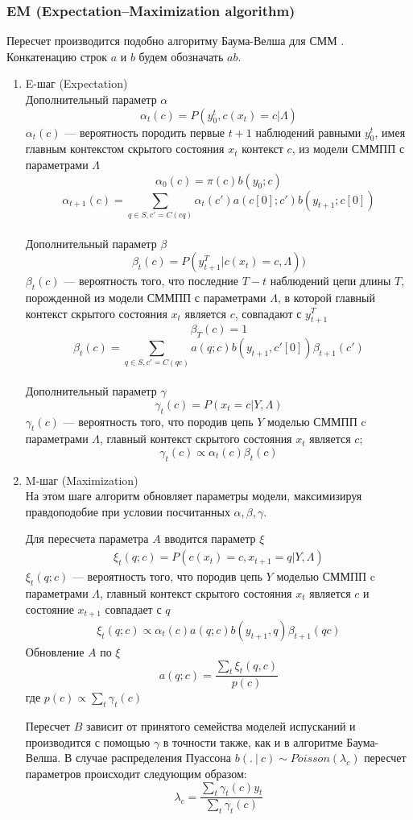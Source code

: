 \documentclass{matmex-diploma-custom}
\begin{document}
\subsubsection{EM (Expectation–Maximization algorithm)}
Пересчет производится подобно алгоритму Баума-Велша для СММ \cite{Rabiner1989}.
\\Конкатенацию строк $a$ и $b$ будем обозначать $ab$.
\\
\begin{enumerate}
\item E-шаг (Expectation)
\\Дополнительный параметр $\alpha$
$$ \alpha_{t}(c) = P(y_{0}^{t}, c(x_{t})=c| \Lambda)$$
$\alpha_{t}(c)$ --- вероятность породить первые $t+1$ наблюдений равными $y_{0}^{t}$, имея главным контекстом  скрытого состояния $x_{t}$ контекст $ c $, из модели СММПП с параметрами $\Lambda$
$$ \alpha_{0}(c) = \pi(c)b(y_{0}; c)$$ 
$$ \alpha_{t+1}(c) = \sum_{q \in S, c'=C(cq)}{\alpha_{t}(c')a(c[0];c')b(y_{t+1}; c[0])}$$
\\Дополнительный параметр $\beta$
$$ \beta_{t}(c) = P(y_{t+1}^{T}| c(x_{t})=c, \Lambda))$$
$\beta_{t}(c)$ --- вероятность того, что последние $T-t$ наблюдений цепи длины $T$, порожденной из модели СММПП с параметрами $\Lambda$, в которой главный контекст скрытого состояния $x_{t}$ является $ c $, совпадают с $y_{t+1}^{T}$
$$ \beta_{T}(c) = 1$$ 
$$ \beta_{t}(c) = \sum_{q \in S, c'=C(qc)}{a(q;c)b(y_{t+1}, c'[0])\beta_{t+1}(c')}$$
\\Дополнительный параметр $\gamma$
$$ \gamma_{t}(c) = P(x_{t}=c|Y,\Lambda) $$ 
$\gamma_{t}(c)$ --- вероятность того, что породив цепь $Y$ моделью СММПП c параметрами $\Lambda$,
главный контекст скрытого состояния $ x_{t} $ является $c$;
$$ \gamma_{t}(c) \propto {\alpha_{t}(c)\beta_{t}(c)}$$

\item M-шаг (Maximization)\\
На этом шаге алгоритм обновляет параметры модели, максимизируя правдоподобие при условии посчитанных $\alpha, \beta, \gamma$.

Для пересчета параметра $A$ вводится параметр $\xi$
\begin{align*}
\xi_{t}(q;c) = P(c(x_{t})=c, x_{t+1} = q| Y, \Lambda)
\end{align*}
$\xi_{t}(q;c)$ --- вероятность того, что породив цепь $Y$ моделью СММПП c параметрами $\Lambda$, 
главный контекст скрытого состояния $ x_{t} $ является $c$ и состояние $ x_{t+1} $ совпадает с $q$
\begin{align*}
\xi_{t}(q;c) \propto {\alpha_{t}(c)a(q;c)b(y_{t+1},q)\beta_{t+1}(qc)} 
\end{align*}
Обновление $ A $ по $ \xi $\\
$$ a(q; c) = \frac{\sum_{t}\xi_{t}(q,c)}{p(c)}$$
где $p(c) \propto \sum_{t}\gamma_{t}(c)$

Пересчет $ B $ зависит от принятого семейства моделей испусканий и производится с помощью $ \gamma $ в точности также, как и в алгоритме Баума-Велша.
В случае распределения Пуассона
$b(.~|~c) \sim \textit{Poisson}(\lambda_{c})$ 
пересчет параметров происходит следующим образом:
$$ \lambda_{c} = \frac{\sum_{t}{\gamma_{t}(c)y_{t}}}{\sum_{t}{\gamma_{t}(c)}}$$
\end{enumerate}
\end{document}
